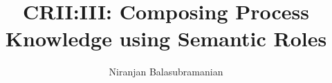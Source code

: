 \documentclass[11pt,onecolumn]{article}
\begin{document}

\title{CRII:III: Composing Process Knowledge using Semantic Roles}
\author{Niranjan Balasubramanian}
\maketitle
\newpage
\thispagestyle{empty}
\newpage
\tableofcontents    %
\thispagestyle{empty}
\setcounter{section}{0}
\setcounter{page}{0}
\newpage
%
\setcounter{page}{1}






\newpage
{\small


}
\end{document}
